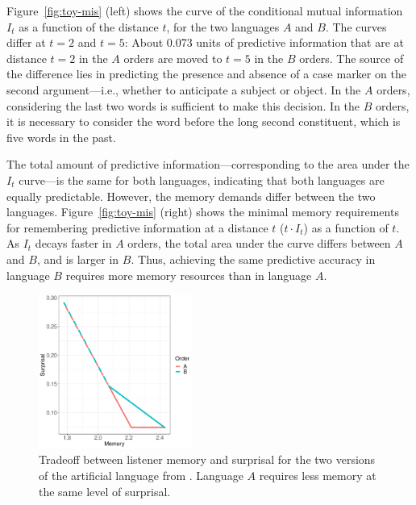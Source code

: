 Figure~\ref{fig:toy-mis} (left) shows the curve of the conditional mutual information $I_t$ as a function of the distance $t$, for the two languages $A$ and $B$. 
The curves differ at $t=2$ and $t=5$: 
About 0.073 units of predictive information that are at distance $t=2$ in the $A$ orders are moved to $t=5$ in the $B$ orders.
The source of the difference lies in predicting the presence and absence of a case marker on the second argument---i.e., whether to anticipate a subject or object.
In the $A$ orders, considering the last two words is sufficient to make this decision.
In the $B$ orders, it is necessary to consider the word before the long second constituent, which is five words in the past.

The total amount of predictive information---corresponding to the area under the $I_t$ curve---is the same for both languages, indicating that both languages are equally predictable. However, the memory demands differ between the two languages. Figure~\ref{fig:toy-mis} (right) shows the minimal memory requirements for remembering predictive information at a distance $t$ ($t\cdot I_t$) as a function of $t$. As $I_t$ decays faster in $A$ orders, the total area under the curve differs between $A$ and $B$, and is larger in $B$. Thus, achieving the same predictive accuracy in language $B$ requires more memory resources than in language $A$.


\begin{figure}
\centering
\includegraphics[width=0.45\textwidth]{figures/toy-mem-surp.pdf}
	\caption{Tradeoff between listener memory and surprisal for the two versions of the artificial language from \cite{fedzechkina-human-2017}. Language $A$ requires less memory at the same level of surprisal. }
	\label{fig:toy-listener-tradeoff}
\end{figure}


